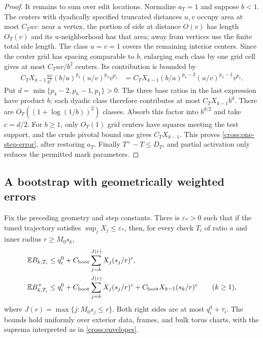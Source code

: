 \begin{proof}
It remains to sum over edit locations.  Normalize $a_T=1$ and suppose
$b<1$.  The centers with dyadically specified truncated distances $u,v$
occupy area at most $C_Tuv$: near a vertex, the portion of side at
distance $O(v)$ has length $O_T(v)$ and its $u$-neighborhood has that
area; away from vertices use the finite total side length.  The class
$u=v=1$ covers the remaining interior centers.  Since the center grid
has spacing comparable to $b$, enlarging each class by one grid cell
gives at most $C_Tuv/b^2$ centers.  Its contribution is bounded by
\begin{align}
 C_TX_{k-1}\frac{uv}{b^2}(b/u)^{p_4}(u/v)^{p_h}v^{p_1}
 &=C_TX_{k-1}(b/u)^{p_4-2}(u/v)^{p_h-1}v^{p_1}.
 \label{cross:area-sum}
\end{align}
Put $d=\min\{p_4-2,p_h-1,p_1\}>0$.
The three base ratios in the last expression have product $b$;
each dyadic class therefore contributes at most $C_TX_{k-1}b^d$.
There are $O_T((1+\log(1/b))^2)$ classes.  Absorb this factor into
$b^{d/2}$ and take $c=d/2$.  For $b\geq1$, only $O_T(1)$ grid centers
have squares meeting the test support, and the crude pivotal bound one
gives $C_TX_{k-1}$.  This proves \eqref{cross:one-step-error}, after
restoring $a_T$.  Finally $T^+-T\leq D_T$, and partial activation only
reduces the permitted mark parameters.
\end{proof}

\subsection{A bootstrap with geometrically weighted errors}

\begin{proposition}
\label{cross:bootstrap}
Fix the preceding geometry and step constants.  There is $\varepsilon_*>0$
such that if the tuned trajectory satisfies $\sup_jX_j\leq\varepsilon_*$,
then, for every check $T_i$ of ratio $a$ and inner radius $r\geq M_0s_k$,
\begin{align}
 \mathbb E B_{k,T_i}
 &\leq q_i^0+C_{\rm boot}\sum_{j=k}^{J(r)}X_j(s_j/r)^c,
 \label{cross:plain-bootstrap}\\
 \mathbb E B^+_{k,T_i}
 &\leq q_i^0+C_{\rm boot}\sum_{j=k}^{J(r)}X_j(s_j/r)^c
          +C_{\rm boot}X_{k-1}(s_k/r)^c\qquad(k\geq1),
 \label{cross:possible-bootstrap}
\end{align}
where $J(r)=\max\{j:M_0s_j\leq r\}$.  Both right sides are at most
$q_i^0+\tau_i$.  The bounds hold uniformly over exterior data, frames,
and bulk torus charts, with the suprema interpreted as in
\eqref{cross:envelopes}.
\end{proposition}

